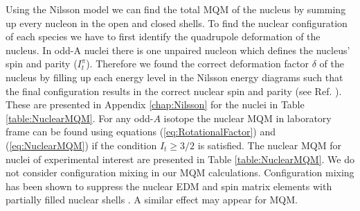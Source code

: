 \documentclass[10pt,a4paper, twoside, openright]{report}
\begin{document}
Using the Nilsson model we can find the total MQM of the nucleus by summing up every nucleon in the open and closed shells. To find the nuclear configuration of each species we have to first identify the quadrupole deformation of the nucleus. In  odd-A nuclei there is  one unpaired nucleon which defines the nucleus' spin  and parity ($I_t^{\pi}$). Therefore we found the correct deformation factor $\delta$ of the nucleus by filling up each energy level in the Nilsson energy diagrams \cite{BohrMottVol2} such that the final configuration results in the correct nuclear spin and parity (see Ref. \cite{BF2018}). These are presented in Appendix \ref{chap:Nilsson} for the nuclei in Table \ref{table:NuclearMQM}.   For any odd-$A$ isotope the nuclear MQM in laboratory frame can be found  using equations (\ref{eq:RotationalFactor})  and (\ref{eq:NuclearMQM}) if the condition $I_t \geq 3/2$ is satisfied. The nuclear MQM  for nuclei of experimental interest are presented in  Table \ref{table:NuclearMQM}. We do not consider configuration mixing in our MQM calculations. Configuration mixing has been shown to suppress the nuclear EDM and spin matrix elements with partially filled nuclear shells \cite{Yoshinaga2010, Yoshinaga2014, Yamanaka2017}. A similar effect may appear for MQM. \\
\end{document}
